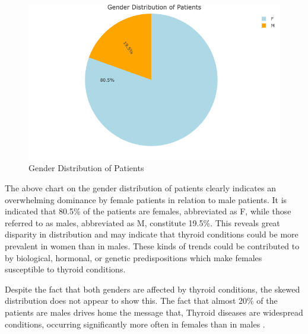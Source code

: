 \documentclass[12pt]{article}
\begin{document}
\begin{enumerate}
 
 \begin{figure}[h]
 \vspace{25pt}
        \centering
        \includegraphics[width=1\textwidth]{Gender Dist.png}  
        \caption{Gender Distribution of Patients}
            \label{fig:example}
       \vspace{0.5cm}
    \end{figure}

The above chart on the gender distribution of patients clearly indicates an overwhelming dominance by female patients in relation to male patients. It is indicated that 80.5\% of the patients are females, abbreviated as F, while those referred to as males, abbreviated as M, constitute 19.5\%. This reveals great disparity in distribution and may indicate that thyroid conditions could be more prevalent in women than in males. These kinds of trends could be contributed to by biological, hormonal, or genetic predispositions which make females susceptible to thyroid conditions.


\hspace{9pt} Despite the fact that both genders are affected by thyroid conditions, the skewed distribution does not appear to show this. The fact that almost 20\% of the patients are males drives home the message that,  Thyroid diseases are widespread conditions, occurring significantly more often in females than in males \citep{Bauer} .

\newpage


\end{enumerate}
\end{document}
